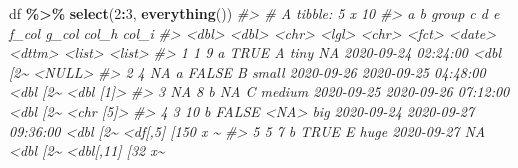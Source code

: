 \documentclass[
]{report}
\newenvironment{Shaded}{\begin{snugshade}}{\end{snugshade}}
\newcommand{\CommentTok}[1]{\textcolor[rgb]{0.56,0.35,0.01}{\textit{#1}}}
\newcommand{\DecValTok}[1]{\textcolor[rgb]{0.00,0.00,0.81}{#1}}
\newcommand{\KeywordTok}[1]{\textcolor[rgb]{0.13,0.29,0.53}{\textbf{#1}}}
\newcommand{\NormalTok}[1]{#1}
\newcommand{\OperatorTok}[1]{\textcolor[rgb]{0.81,0.36,0.00}{\textbf{#1}}}
\newcommand{\StringTok}[1]{\textcolor[rgb]{0.31,0.60,0.02}{#1}}
\begin{document}
\begin{Shaded}
\begin{Highlighting}[]
\NormalTok{df }\OperatorTok{\%\textgreater{}\%}
\StringTok{  }\KeywordTok{select}\NormalTok{(}\DecValTok{2}\OperatorTok{:}\DecValTok{3}\NormalTok{, }\KeywordTok{everything}\NormalTok{())}
\CommentTok{\#\textgreater{} \# A tibble: 5 x 10}
\CommentTok{\#\textgreater{}       a     b group c     d     e      f\_col      g\_col               col\_h    col\_i           }
\CommentTok{\#\textgreater{}   \textless{}dbl\textgreater{} \textless{}dbl\textgreater{} \textless{}chr\textgreater{} \textless{}lgl\textgreater{} \textless{}chr\textgreater{} \textless{}fct\textgreater{}  \textless{}date\textgreater{}     \textless{}dttm\textgreater{}              \textless{}list\textgreater{}   \textless{}list\textgreater{}          }
\CommentTok{\#\textgreater{} 1     1     9 a     TRUE  A     tiny   NA         2020{-}09{-}24 02:24:00 \textless{}dbl [2\textasciitilde{} \textless{}NULL\textgreater{}          }
\CommentTok{\#\textgreater{} 2     4    NA a     FALSE B     small  2020{-}09{-}26 2020{-}09{-}25 04:48:00 \textless{}dbl [2\textasciitilde{} \textless{}dbl [1]\textgreater{}       }
\CommentTok{\#\textgreater{} 3    NA     8 b     NA    C     medium 2020{-}09{-}25 2020{-}09{-}26 07:12:00 \textless{}dbl [2\textasciitilde{} \textless{}chr [5]\textgreater{}       }
\CommentTok{\#\textgreater{} 4     3    10 b     FALSE \textless{}NA\textgreater{}  big    2020{-}09{-}24 2020{-}09{-}27 09:36:00 \textless{}dbl [2\textasciitilde{} \textless{}df[,5] [150 x \textasciitilde{}}
\CommentTok{\#\textgreater{} 5     5     7 b     TRUE  E     huge   2020{-}09{-}27 NA                  \textless{}dbl [2\textasciitilde{} \textless{}dbl[,11] [32 x\textasciitilde{}}
\end{Highlighting}
\end{Shaded}
\end{document}
